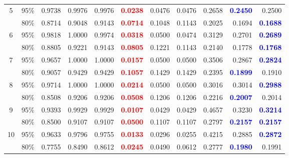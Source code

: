 \begin{longtable}{ccrrrrrrrrr}
\cmidrule(lr){1-11}
5 & 95\% & 0.9738 & 0.9976 & 0.9976 & \textcolor{red}{\textbf{0.0238}} & 0.0476 & 0.0476 & 0.2658 & \textcolor{blue}{\textbf{0.2450}} & 0.2500 \\
 & 80\% & 0.8714 & 0.9048 & 0.9143 & \textcolor{red}{\textbf{0.0714}} & 0.1048 & 0.1143 & 0.2025 & 0.1694 & \textcolor{blue}{\textbf{0.1688}} \\
\cmidrule(lr){1-11}
6 & 95\% & 0.9818 & 1.0000 & 0.9974 & \textcolor{red}{\textbf{0.0318}} & 0.0500 & 0.0474 & 0.3129 & 0.2701 & \textcolor{blue}{\textbf{0.2689}} \\
 & 80\% & 0.8805 & 0.9221 & 0.9143 & \textcolor{red}{\textbf{0.0805}} & 0.1221 & 0.1143 & 0.2140 & 0.1778 & \textcolor{blue}{\textbf{0.1768}} \\
\cmidrule(lr){1-11}
7 & 95\% & 0.9657 & 1.0000 & 1.0000 & \textcolor{red}{\textbf{0.0157}} & 0.0500 & 0.0500 & 0.3506 & 0.2867 & \textcolor{blue}{\textbf{0.2824}} \\
 & 80\% & 0.9057 & 0.9429 & 0.9429 & \textcolor{red}{\textbf{0.1057}} & 0.1429 & 0.1429 & 0.2395 & \textcolor{blue}{\textbf{0.1899}} & 0.1910 \\
\cmidrule(lr){1-11}
8 & 95\% & 0.9714 & 1.0000 & 1.0000 & \textcolor{red}{\textbf{0.0214}} & 0.0500 & 0.0500 & 0.3016 & 0.3014 & \textcolor{blue}{\textbf{0.2988}} \\
 & 80\% & 0.8508 & 0.9206 & 0.9206 & \textcolor{red}{\textbf{0.0508}} & 0.1206 & 0.1206 & 0.2216 & \textcolor{blue}{\textbf{0.2007}} & 0.2014 \\
\cmidrule(lr){1-11}
9 & 95\% & 0.9393 & 0.9929 & 0.9929 & \textcolor{red}{\textbf{0.0107}} & 0.0429 & 0.0429 & 0.4657 & 0.3230 & \textcolor{blue}{\textbf{0.3214}} \\
 & 80\% & 0.8500 & 0.9107 & 0.9107 & \textcolor{red}{\textbf{0.0500}} & 0.1107 & 0.1107 & 0.2797 & \textcolor{blue}{\textbf{0.2157}} & \textcolor{blue}{\textbf{0.2157}} \\
\cmidrule(lr){1-11}
10 & 95\% & 0.9633 & 0.9796 & 0.9755 & \textcolor{red}{\textbf{0.0133}} & 0.0296 & 0.0255 & 0.4215 & 0.2885 & \textcolor{blue}{\textbf{0.2872}} \\
 & 80\% & 0.7755 & 0.8490 & 0.8612 & \textcolor{red}{\textbf{0.0245}} & 0.0490 & 0.0612 & 0.2777 & \textcolor{blue}{\textbf{0.1980}} & 0.1991 \\
\bottomrule
\end{longtable}
\endgroup
\endgroup
